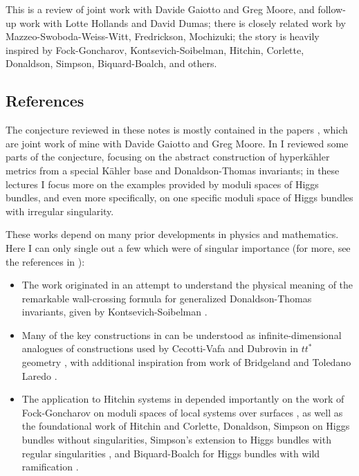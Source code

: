 \documentclass[12pt,letterpaper,reqno]{article}
\newcounter{papers}\setcounter{papers}{0}
\numberwithin{equation}{section}
\begin{document}
This is a review of joint work with Davide Gaiotto and Greg Moore,
and follow-up work with Lotte Hollands and David Dumas; 
there is closely related 
work by Mazzeo-Swoboda-Weiss-Witt, Fredrickson, Mochizuki; 
the story is heavily inspired by Fock-Goncharov, Kontsevich-Soibelman, Hitchin,
Corlette, Donaldson, Simpson, Biquard-Boalch, and others.

\subsection{References}

The conjecture reviewed in these notes is mostly contained in 
the papers \cite{Gaiotto:2008cd,Gaiotto:2009hg},
which are joint work of mine with Davide Gaiotto and Greg
Moore.
In \cite{notes-hk} I reviewed some parts of the conjecture,
focusing on the abstract construction of hyperk\"ahler metrics from a
special K\"ahler base and Donaldson-Thomas invariants;
in these lectures I focus more on the examples provided by
moduli spaces of Higgs bundles,
and even more specifically, on one specific moduli space of
Higgs bundles with irregular singularity.

These works depend on many prior developments
in physics and mathematics. Here I can only single out a few
which were of singular importance (for more, see the references
in \cite{Gaiotto:2008cd,Gaiotto:2009hg}):
\begin{itemize}
\item The work \cite{Gaiotto:2008cd} 
originated in an attempt to understand the physical
meaning of the remarkable wall-crossing formula for generalized
Donaldson-Thomas invariants, given by Kontsevich-Soibelman \cite{ks1}.
\item Many of the key constructions in 
\cite{Gaiotto:2008cd} can
be understood as infinite-dimensional analogues 
of constructions used by Cecotti-Vafa and Dubrovin in 
$tt^*$ geometry \cite{Cecotti:1993rm,MR1213301}, with
additional inspiration from work of Bridgeland and 
Toledano Laredo \cite{stab-stokes}.
\item The application to Hitchin systems
in \cite{Gaiotto:2009hg} depended importantly on
the work of Fock-Goncharov on moduli spaces
of local systems over surfaces \cite{MR2233852},
as well as the foundational work
of Hitchin \cite{MR89a:32021} and Corlette, Donaldson, Simpson
\cite{MR965220,MR887285,MR944577} on Higgs bundles without
singularities, Simpson's extension to 
Higgs bundles with regular 
singularities \cite{hbnc}, and Biquard-Boalch for Higgs
bundles with wild ramification \cite{wnh}.
\end{itemize}
\end{document}

